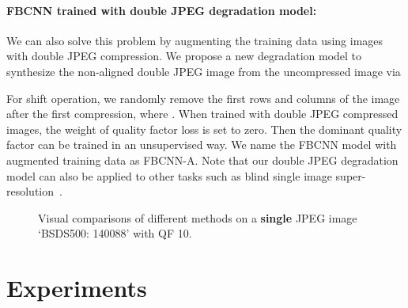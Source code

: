 \documentclass[10pt,twocolumn,letterpaper]{article}
\begin{document}
\vspace{-0.2cm}
\paragraph{FBCNN trained with double JPEG degradation model:} We can also solve this problem by augmenting the training data using images with double JPEG compression. We propose a new degradation model to synthesize the non-aligned double JPEG image  from the uncompressed image  via

For shift operation, we randomly remove the first  rows and  columns of the image after the first compression, where . When trained with double JPEG compressed images, the weight of quality factor loss is set to zero. Then the dominant quality factor can be trained in an unsupervised way. We name the FBCNN model with augmented training data as FBCNN-A. Note that our double JPEG degradation model can also be applied to other tasks such as blind single image super-resolution~\cite{zhang2021designing}.


\begin{figure*}[hbt]
\centering
{}
\caption{Visual comparisons of different methods on a \textbf{single} JPEG image `BSDS500: 140088' with QF  10.}
\label{fig: singlecompare}
\end{figure*}


\section{Experiments}
\end{document}
